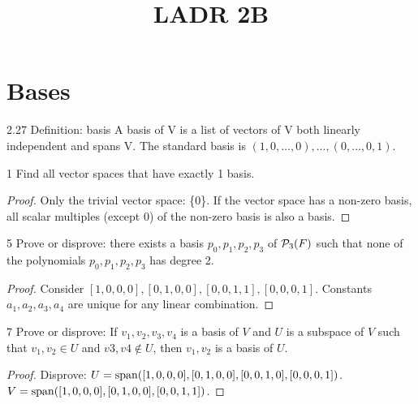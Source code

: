 \documentclass[12pt, letterpaper]{article}
\title{LADR 2B}
\begin{document}
\maketitle

\section*{Bases}

\begin{imp}{2.27 Definition: basis}
A basis of V is a list of vectors of V both linearly independent and spans V.
The standard basis is $(1,0,\dots,0),...,(0,\dots,0,1)$.
\end{imp}

\begin{problem}{1}
Find all vector spaces that have exactly 1 basis.
\end{problem}
\begin{proof}
Only the trivial vector space: \{0\}.
If the vector space has a non-zero basis, all scalar multiples (except 0) of the non-zero basis is also a basis.
\end{proof}

\begin{problem}{5}
Prove or disprove: there exists a basis $p_0,p_1,p_2,p_3$ of $\mathcal{P}_3(F)$
such that none of the polynomials $p_0,p_1,p_2,p_3$ has degree 2.
\end{problem}
\begin{proof}
Consider $[1,0,0,0],[0,1,0,0],[0,0,1,1],[0,0,0,1]$.
Constants $a_1,a_2,a_3,a_4$ are unique for any linear combination.
\end{proof}

\begin{problem}{7}
Prove or disprove: If $v_1,v_2,v_3,v_4$ is a basis of $V$ and $U$ is a subspace
of $V$ such that $v_1,v_2\in U$ and $v3,v4\notin U$, then $v_1,v_2$ is a basis of $U$.
\end{problem}
\begin{proof}
Disprove: $U=\operatorname{span}([1,0,0,0],[0,1,0,0],[0,0,1,0],[0,0,0,1])$.
$V=\operatorname{span}([1,0,0,0],[0,1,0,0],[0,0,1,1])$.
\end{proof}
\end{document}
